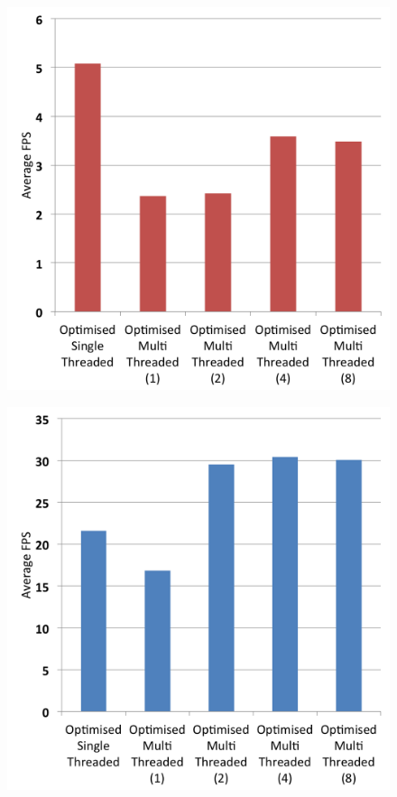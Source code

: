 \documentclass{acm_proc_article-sp}
\begin{document}
\begin{figure}[htbp]
\centering
\begin{minipage}{.5\textwidth}
  \centering
  \includegraphics[width=\textwidth]{images/performance/multi-beaglebone-fps.png}
  \label{fig:multi-opt-beaglebone-fps}
\end{minipage}%
\begin{minipage}{.5\textwidth}
  \centering
  \includegraphics[width=\textwidth]{images/performance/multi-odroid-fps.png}

\end{minipage}
\end{figure}
\end{document}
